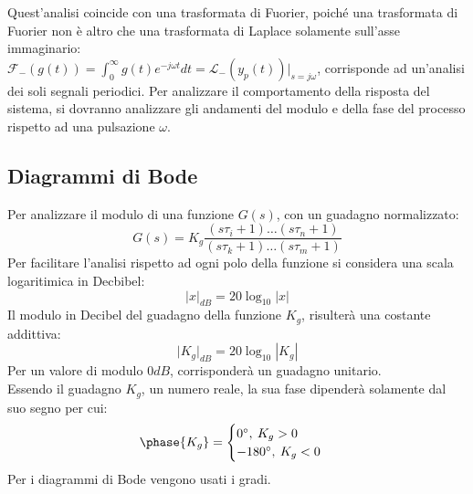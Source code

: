 \documentclass{article}
\numberwithin{equation}{subsection}
\begin{document}
\begin{center}
\end{center}

Quest'analisi coincide con una trasformata di Fuorier, poiché una trasformata di Fuorier non è altro che una trasformata di Laplace solamente sull'asse 
immaginario: \\$\displaystyle\mathscr{F}_-(g(t))=\int_{0}^{\infty}g(t)e^{-j\omega t}dt=\mathscr{L}_-(y_p(t))\bigg|_{s=j\omega}$, corrisponde ad un'analisi dei soli segnali periodici. 
Per analizzare il comportamento della risposta del sistema, si dovranno analizzare gli andamenti del modulo e della fase del processo rispetto ad una pulsazione $\omega$. 

\subsection{Diagrammi di Bode}

Per analizzare il modulo di una funzione $G(s)$, con un guadagno normalizzato:
\begin{equation}
    G(s)=K_g\displaystyle\frac{(s\tau_i+1)\ldots(s\tau_n+1)}{(s\tau_k+1)\ldots(s\tau_m+1)}
\end{equation}
Per facilitare l'analisi rispetto ad ogni polo della funzione si considera una scala logaritimica in Decbibel:
\begin{equation}
    \big|x\big|_{dB}=20\log_{10}|x|
\end{equation}
Il modulo in Decibel del guadagno della funzione $K_g$, risulterà una costante addittiva:
\begin{equation}
    \big|K_g\big|_{dB}=20\log_{10}|K_g|
\end{equation}
Per un valore di modulo $0dB$, corrisponderà un guadagno unitario. \\
Essendo il guadagno $K_g$, un numero reale, la sua fase dipenderà solamente dal suo segno per cui: 
\begin{equation}
    \phase{K_g}=
    \begin{cases}
        0^\circ,\: K_g>0\\
        -180^\circ,\:K_g<0
    \end{cases}
\end{equation}
Per i diagrammi di Bode vengono usati i gradi.\\
\end{document}
